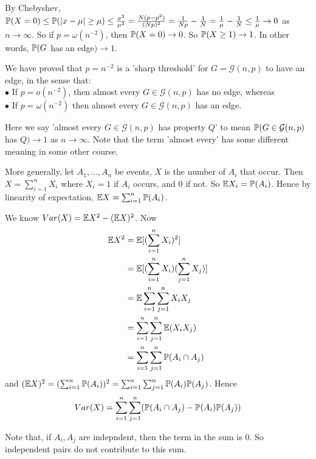 \documentclass[a4paper]{article}
\begin{document}
By Chebyshev, $\P(X=0) \leq \P(|x-\mu| \geq \mu) \leq \frac{\sigma^2}{\mu^2} = \frac{N(p-p^2)}{(Np)^2} = \frac{1}{Np}-\frac{1}{N} = \frac{1}{\mu} - \frac{1}{N} \leq \frac{1}{\mu} \to 0$ as $n \to \infty$. So if $p = \omega(n^{-2})$, then $\P(X=0) \to 0$. So $\P(X \geq 1) \to 1$. In other words, $\P(G$ has an edge$) \to 1$.

We have proved that $p=n^{-2}$ is a 'sharp threshold' for $G = \mathcal{G}(n,p)$ to have an edge, in the sense that:\\
$\bullet$ If $p=o(n^{-2})$, then almost every $G \in \mathcal{G}(n,p)$ has no edge, whereas\\
$\bullet$ If $p = \omega(n^{-2})$ then almost every $G \in \mathcal{G}(n,p)$ has an edge.

Here we say 'almost every $G \in \mathcal{G}(n,p)$ has property $Q$' to mean $\P(G \in \mathcal{G}(n,p)$ has $Q) \to 1$ as $n \to \infty$. Note that the term 'almost every' has some different meaning in some other course.

More generally, let $A_1,...,A_n$ be events, $X$ is the number of $A_i$ that occur. Then $X = \sum_{i=1}^n X_i$ where $X_i=1$ if $A_i$ occurs, and $0$ if not. So $\E X_i = \P(A_i)$. Hence by linearity of expectation, $\E X = \sum_{i=1}^n \P(A_i)$.

We know $Var(X) = \E X^2 - (\E X)^2$. Now 
\begin{equation*}
\begin{aligned}
\E X^2 &= \E [(\sum_{i=1}^n X_i)^2]\\&= \E[(\sum_{i=1}^n X_i) (\sum_{j=1}^n X_j)]\\&=\E \sum_{i=1}^n \sum_{j=1}^n X_i X_j\\&=\sum_{i=1}^n \sum_{j=1}^n \E(X_i X_j) \\&= \sum_{i=1}^n \sum_{j=1}^n \P(A_i \cap A_j)
\end{aligned}
\end{equation*}
and $(\E X)^2 = (\sum_{i=1}^n \P(A_i))^2 = \sum_{i=1}^n \sum_{j=1}^n \P(A_i) \P(A_j)$. Hence $$Var(X) = \sum_{i=1}^n \sum_{j=1}^n (\P(A_i \cap A_j) - \P(A_i) \P(A_j))$$

Note that, if $A_i,A_j$ are indepndent, then the term in the sum is $0$. So independent pairs do not contribute to this sum.
\end{document}
